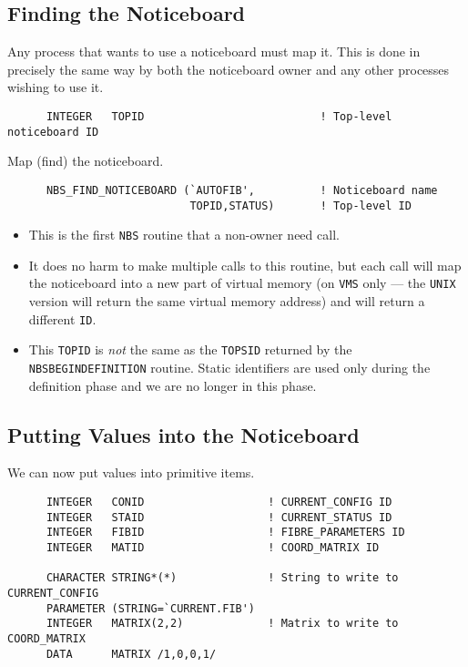 \documentclass[twoside,11pt]{article}
\renewcommand{\_}{\texttt{\symbol{95}}}
\begin{document}
\subsection {Finding the Noticeboard}

Any process that wants to use a noticeboard must map it. This is done in
precisely the same way by both the noticeboard owner and any other processes
wishing to use it.

\begin {verbatim}
      INTEGER   TOPID                           ! Top-level noticeboard ID
\end{verbatim}

Map (find) the noticeboard.

\begin {verbatim}
      NBS_FIND_NOTICEBOARD (`AUTOFIB',          ! Noticeboard name
                            TOPID,STATUS)       ! Top-level ID
\end{verbatim}

\begin {itemize}
\item This is the first {\tt NBS} routine that a non-owner need call.
\item It does no harm to make multiple calls to this routine, but each call will
map the noticeboard into a new part of virtual memory (on {\tt VMS} only ---
the {\tt UNIX} version will return the same virtual memory address) and will
return a different {\tt ID}.
\item This {\tt TOPID} is {\em not} the same as the {\tt TOPSID} returned by
the {\tt NBS\_BEGIN\_DEFINITION} routine. Static identifiers are used only
during the definition phase and we are no longer in this phase.
\end {itemize}

\subsection {Putting Values into the Noticeboard}

We can now put values into primitive items.

\begin {verbatim}
      INTEGER   CONID                   ! CURRENT_CONFIG ID
      INTEGER   STAID                   ! CURRENT_STATUS ID
      INTEGER   FIBID                   ! FIBRE_PARAMETERS ID
      INTEGER   MATID                   ! COORD_MATRIX ID

      CHARACTER STRING*(*)              ! String to write to CURRENT_CONFIG
      PARAMETER (STRING=`CURRENT.FIB')
      INTEGER   MATRIX(2,2)             ! Matrix to write to COORD_MATRIX
      DATA      MATRIX /1,0,0,1/
\end{verbatim}
\end{document}
